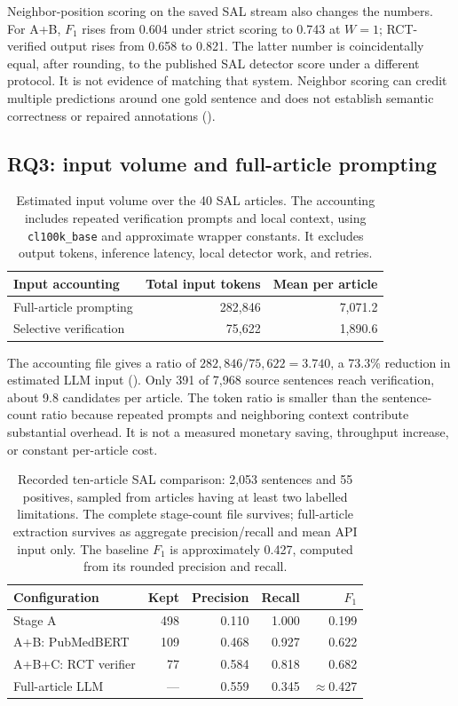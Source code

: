 Neighbor-position scoring on the saved SAL stream also changes the numbers. For A+B, $F_1$
rises from 0.604 under strict scoring to 0.743 at $W=1$; RCT-verified output rises from 0.658 to
0.821. The latter number is coincidentally equal, after rounding, to the published SAL detector
score under a different protocol. It is not evidence of matching that system. Neighbor scoring
can credit multiple predictions around one gold sentence and does not establish semantic
correctness or repaired annotations ().

\subsection{RQ3: input volume and full-article prompting}

\begin{table}[t]
\centering
\small
\caption{Estimated input volume over the 40 SAL articles. The accounting includes repeated
verification prompts and local context, using \texttt{cl100k\_base} and approximate wrapper
constants. It excludes output tokens, inference latency, local detector work, and retries.}
\label{T:tokens}
\begin{tabular}{@{}lrr@{}}
\toprule
Input accounting & Total input tokens & Mean per article \\
\midrule
Full-article prompting & 282,846 & 7,071.2 \\
Selective verification & 75,622 & 1,890.6 \\
\bottomrule
\end{tabular}
\end{table}

The accounting file gives a ratio of $282{,}846/75{,}622=3.740$,
a 73.3\% reduction in estimated LLM input (). Only 391 of 7,968 source sentences
reach verification, about 9.8 candidates per article. The token ratio is smaller than the
sentence-count ratio because repeated prompts and neighboring context contribute substantial
overhead. It is not a measured monetary saving, throughput increase, or constant per-article cost.

\begin{table}[t]
\centering
\small
\caption{Recorded ten-article SAL comparison: 2,053 sentences and 55 positives, sampled from
articles having at least two labelled limitations. The complete stage-count file survives;
full-article extraction survives as aggregate precision/recall and mean API input only.
The baseline $F_1$ is approximately 0.427, computed from its rounded precision and recall.}
\label{T:full-paper}
\begin{tabular}{@{}lrrrr@{}}
\toprule
Configuration & Kept & Precision & Recall & $F_1$ \\
\midrule
Stage A & 498 & 0.110 & 1.000 & 0.199 \\
A+B: PubMedBERT & 109 & 0.468 & 0.927 & 0.622 \\
A+B+C: RCT verifier & 77 & 0.584 & 0.818 & 0.682 \\
Full-article LLM & --- & 0.559 & 0.345 & $\approx$0.427 \\
\bottomrule
\end{tabular}
\end{table}

